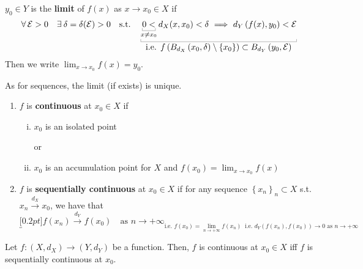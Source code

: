 \begin{defn}
$y_0\in Y$ is the \textbf{limit} of $f(x)$ as $x\to x_0\in X$ if
\begin{equation*}
\forall \Ec>0\quad \exists\delta=\delta(\Ec)>0\quad\text{s.t.}\quad \underbracket[0.2pt]{ \underbracket[0.2pt]{0<}_{x\neq x_0}d_X(x,x_0)<\delta\ \Longrightarrow\ d_Y\left( f(x),y_0 \right)<\Ec }_{\displaystyle\text{i.e. }f\left( B_{d_X}\left(x_0,\delta\right)\setminus\left\{ x_0 \right\} \right)\subset B_{d_Y}\left( y_0,\Ec \right)}
\end{equation*}
Then we write $\displaystyle\lim_{x\to x_0}f(x)=y_0$.
\end{defn}

As for sequences, the limit (if exists) is unique.

\begin{defn}
\leavevmode
\begin{enumerate}
    \item $f$ is \textbf{continuous} at $x_0\in X$ if
    \begin{enumerate}[(i)]
        \item $x_0$ is an isolated point

        or

        \item $x_0$ is an accumulation point for $X$ and $f(x_0)=\displaystyle\lim_{x\to x_0} f(x)$
    \end{enumerate}

    \item $f$ is \textbf{sequentially continuous} at $x_0\in X$ if for any sequence $\left\{ x_n \right\}_n\subset X$ s.t. $x_n\overset{d_X}\longrightarrow x_0$, we have that
    \begin{equation*}
    \underbracket[0.2pt]{f\left( x_n \right)\overset{d_Y}\longrightarrow f\left( x_0 \right)\quad\text{as }n\to+\infty}_{\displaystyle\text{i.e. }f\left( x_0 \right)=\lim_{n\to+\infty}f(x_n)\ \text{ i.e. }d_Y\left( f\left( x_n\right),f\left( x_0 \right) \right)\to 0\text{ as }n\to+\infty}
    \end{equation*}
\end{enumerate}
\end{defn}

\begin{thm}
Let $f:\left( X,d_X \right)\to\left( Y,d_Y \right)$ be a function. Then, $f$ is continuous at $x_0\in X$ iff $f$ is sequentially continuous at $x_0$.
\end{thm}

























